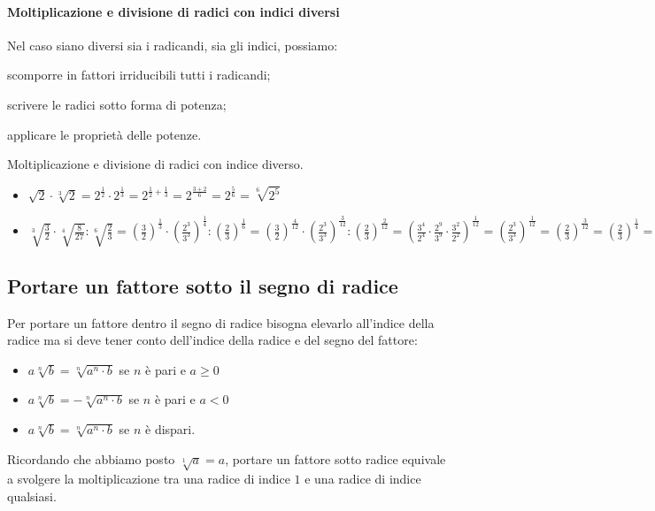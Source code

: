 \paragraph{Moltiplicazione e divisione di radici con indici diversi}

Nel caso siano diversi sia i radicandi, sia gli indici, possiamo:
\begin{procedura}{}{}
\begin{enumeratea}
\item scomporre in fattori irriducibili tutti i radicandi;
\item scrivere le radici sotto forma di potenza;
\item applicare le proprietà delle potenze.
\end{enumeratea}
\end{procedura}

% 
\begin{esempio}{}{}
Moltiplicazione e divisione di radici con indice diverso.
\begin{itemize}
\item \(\sqrt{2}\cdot \sqrt[3]2=
      2^\frac{1}{2} \cdot 2^\frac{1}{3} = 2^{\frac{1}{2} + \frac{1}{3}} =
      2^{\frac{3+2}{6}} = 2^{\frac{5}{6}} =\sqrt[6]{2^5}\)
\item 
\(\sqrt[3]{\frac{3}{2}} \cdot \sqrt[4]{\frac{8}{27}} : 
\sqrt[6]{\frac{2}{3}}=
  \left(\frac{3}{2}\right)^{\frac{1}{3}} \cdot 
  \left(\frac{2^3}{3^3}\right)^{\frac{1}{4}} : 
  \left(\frac{2}{3}\right)^{\frac{1}{6}}=
  \left(\frac{3}{2}\right)^{\frac{4}{12}} \cdot 
  \left(\frac{2^3}{3^3}\right)^{\frac{3}{12}} : 
  \left(\frac{2}{3}\right)^{\frac{2}{12}}=
  \left(\frac{3^4}{2^4} \cdot 
  \frac{2^9}{3^9} \cdot 
  \frac{3^2}{2^2}\right)^{\frac{1}{12}}=
  \left(\frac{2^3}{3^3}\right)^{\frac{1}{12}}=
  \left(\frac{2}{3}\right)^{\frac{3}{12}}=
  \left(\frac{2}{3}\right)^{\frac{1}{4}}=\sqrt[4]{\frac{2}{3}}\)
\end{itemize}
\end{esempio}

\subsection{Portare un fattore sotto il segno di radice}

Per portare un fattore dentro il segno di radice bisogna elevarlo 
all'indice della radice ma si deve tener conto dell'indice della radice e 
del segno del fattore:
\begin{itemize} [noitemsep]
\item \(a\sqrt[n]b=\sqrt[n]{a^n\cdot b}\) se \(n\) è pari e \(a\geqslant 0\)
\item \(a\sqrt[n]b=-\sqrt[n]{a^n\cdot b}\) se \(n\) è pari e \(a<0\)
\item \(a\sqrt[n]b=\sqrt[n]{a^n\cdot b}\) se \(n\) è dispari.
\end{itemize}
Ricordando che abbiamo posto \(\sqrt[1]a=a\), portare un fattore sotto 
radice equivale a svolgere la moltiplicazione tra una radice di indice 
\(1\) e una radice di indice qualsiasi.

